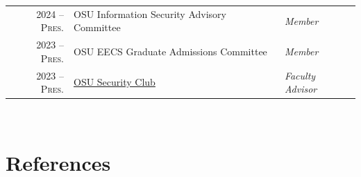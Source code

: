 \documentclass[10pt,singlecolumn]{article} %
\begin{document}
\begin{tabular}{rll}
2024 -- \textsc{Pres.} & OSU Information Security Advisory Committee & \emph{Member} \\
2023 -- \textsc{Pres.} & OSU EECS Graduate Admissions Committee & \emph{Member} \\
2023 -- \textsc{Pres.} & \href{https://osusec.org/}{OSU Security Club} & \emph{Faculty Advisor} \\
\end{tabular} \\



\section{References}
\end{document}

